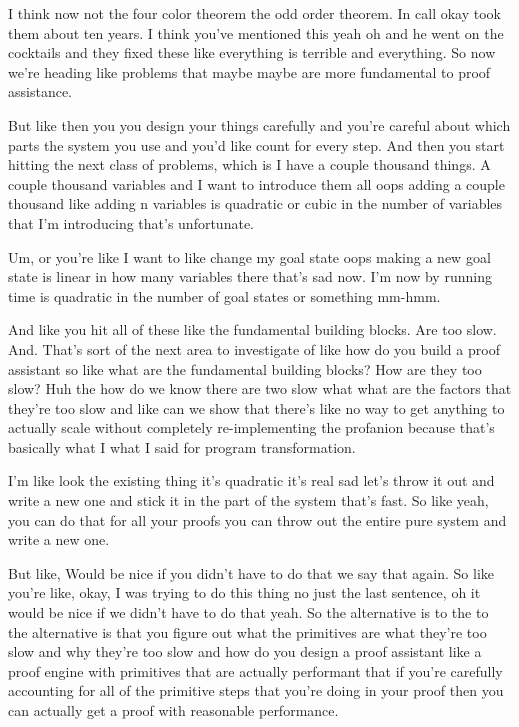 I think now not the four color theorem the odd order theorem. In call okay took them about ten years. I think you've mentioned this yeah oh and he went on the cocktails and they fixed these like everything is terrible and everything. So now we're heading like problems that maybe maybe are more fundamental to proof assistance. 

But like then you you design your things carefully and you're careful about which parts the system you use and you'd like count for every step. And then you start hitting the next class of problems, which is I have a couple thousand things. A couple thousand variables and I want to introduce them all oops adding a couple thousand like adding n variables is quadratic or cubic in the number of variables that I'm introducing that's unfortunate. 

Um, or you're like I want to like change my goal state oops making a new goal state is linear in how many variables there that's sad now. I'm now by running time is quadratic in the number of goal states or something mm-hmm. 

And like you hit all of these like the fundamental building blocks. Are too slow. And. That's sort of the next area to investigate of like how do you build a proof assistant so like what are the fundamental building blocks? How are they too slow? Huh the how do we know there are two slow what what are the factors that they're too slow and like can we show that there's like no way to get anything to actually scale without completely re-implementing the profanion because that's basically what I what I said for program transformation. 

I'm like look the existing thing it's quadratic it's real sad let's throw it out and write a new one and stick it in the part of the system that's fast. So like yeah, you can do that for all your proofs you can throw out the entire pure system and write a new one. 

But like, Would be nice if you didn't have to do that we say that again. So like you're like, okay, I was trying to do this thing no just the last sentence, oh it would be nice if we didn't have to do that yeah. So the alternative is to the to the alternative is that you figure out what the primitives are what they're too slow and why they're too slow and how do you design a proof assistant like a proof engine with primitives that are actually performant that if you're carefully accounting for all of the primitive steps that you're doing in your proof then you can actually get a proof with reasonable performance. 

